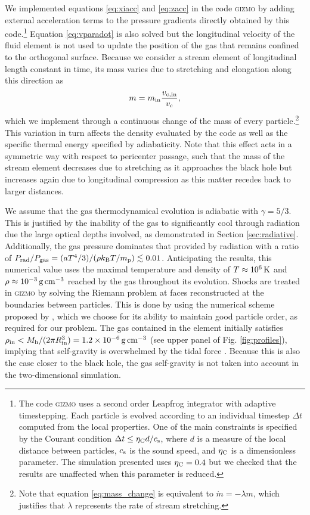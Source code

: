 \documentclass[a4paper,fleqn,usenatbib]{mnras}
\newcommand{\be}{\begin{equation}}
\newcommand{\ee}{\end{equation}}
\newcommand{\mh}{M_{\rm h}}
\def\gpercm3{\, \rm g \, cm^{-3}}
\def\kelvin{\, \rm K}
\begin{document}
We implemented equations \eqref{eq:xiacc} and \eqref{eq:zacc} in the code \textsc{gizmo} \citep{hopkins2015} by adding external acceleration terms to the pressure gradients directly obtained by this code.\footnote{The code \textsc{gizmo} uses a second order Leapfrog integrator with adaptive timestepping. Each particle is evolved according to an individual timestep  $\Delta t$ computed from the local properties. One of the main constraints is specified by the Courant condition $\Delta t \leq \eta_{\rm C} d/c_{\rm s}$, where $d$ is a measure of the local distance between particles, $c_{\rm s}$ is the sound speed, and $\eta_{\rm C}$ is a dimensionless parameter. The simulation presented uses $\eta_{\rm C} = 0.4$ but we checked that the results are unaffected when this parameter is reduced.} Equation \eqref{eq:vparadot} is also solved but the longitudinal velocity of the fluid element is not used to update the position of the gas that remains confined to the orthogonal surface. Because we consider a stream element of longitudinal length constant in time, its mass varies due to stretching and elongation along this direction as
\be
m = m_{\rm in} \frac{v_{\rm c, in}}{v_{\rm c}},
\label{eq:mass_change}
\ee
which we implement through a continuous change of the mass of every particle.\footnote{Note that equation \eqref{eq:mass_change} is equivalent to $\dot{m} = - \lambda m$, which justifies that $\lambda$ represents the rate of stream stretching.} This variation in turn affects the density evaluated by the code as well as the specific thermal energy specified by adiabaticity. Note that this effect acts in a symmetric way with respect to pericenter passage, such that the mass of the stream element decreases due to stretching as it approaches the black hole but increases again due to longitudinal compression as this matter recedes back to larger distances.




We assume that the gas thermodynamical evolution is adiabatic with $\gamma = 5/3$. This is justified by the inability of the gas to significantly cool through radiation due the large optical depths involved, as demonstrated in Section \ref{sec:radiative}. Additionally, the gas pressure dominates that provided by radiation with a ratio of $P_{\rm rad} / P_{\rm gas} = (a T^4 /3) / (\rho k_{\rm B} T / m_{\rm p}) \lesssim 0.01$. Anticipating the results, this numerical value uses the maximal temperature and density of $T \approx 10^6 \kelvin$ and $\rho \approx 10^{-3} \gpercm3$ reached by the gas throughout its evolution. Shocks are treated in \textsc{gizmo} by solving the Riemann problem at faces reconstructed at the boundaries between particles. This is done by using the numerical scheme proposed by \citet{panuelos2020}, which we choose for its ability to maintain good particle order, as required for our problem. The gas contained in the element initially satisfies $\rho_{\rm in} < \mh /(2 \pi R^3_{\rm in}) = 1.2 \times 10^{-6} \gpercm3 $ (see upper panel of Fig. \ref{fig:profiles}), implying that self-gravity is overwhelmed by the tidal force \citep{coughlin2016-structure}. Because this is also the case closer to the black hole, the gas self-gravity is not taken into account in the two-dimensional simulation.
\end{document}
